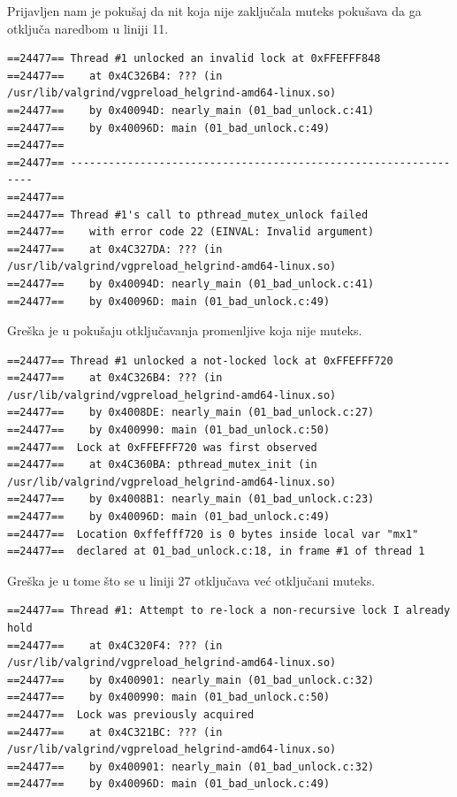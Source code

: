 Prijavljen nam je pokušaj da nit koja nije zaključala muteks pokušava da ga otključa naredbom u liniji 11.

\begin{verbatim}
==24477== Thread #1 unlocked an invalid lock at 0xFFEFFF848
==24477==    at 0x4C326B4: ??? (in /usr/lib/valgrind/vgpreload_helgrind-amd64-linux.so)
==24477==    by 0x40094D: nearly_main (01_bad_unlock.c:41)
==24477==    by 0x40096D: main (01_bad_unlock.c:49)
==24477==
==24477== ----------------------------------------------------------------
==24477==
==24477== Thread #1's call to pthread_mutex_unlock failed
==24477==    with error code 22 (EINVAL: Invalid argument)
==24477==    at 0x4C327DA: ??? (in /usr/lib/valgrind/vgpreload_helgrind-amd64-linux.so)
==24477==    by 0x40094D: nearly_main (01_bad_unlock.c:41)
==24477==    by 0x40096D: main (01_bad_unlock.c:49)
\end{verbatim}

Greška je u pokušaju otključavanja promenljive koja nije muteks.

\begin{verbatim}
==24477== Thread #1 unlocked a not-locked lock at 0xFFEFFF720
==24477==    at 0x4C326B4: ??? (in /usr/lib/valgrind/vgpreload_helgrind-amd64-linux.so)
==24477==    by 0x4008DE: nearly_main (01_bad_unlock.c:27)
==24477==    by 0x400990: main (01_bad_unlock.c:50)
==24477==  Lock at 0xFFEFFF720 was first observed
==24477==    at 0x4C360BA: pthread_mutex_init (in /usr/lib/valgrind/vgpreload_helgrind-amd64-linux.so)
==24477==    by 0x4008B1: nearly_main (01_bad_unlock.c:23)
==24477==    by 0x40096D: main (01_bad_unlock.c:49)
==24477==  Location 0xffefff720 is 0 bytes inside local var "mx1"
==24477==  declared at 01_bad_unlock.c:18, in frame #1 of thread 1
\end{verbatim}

Greška je u tome što se u liniji 27 otključava već otključani muteks.

\begin{verbatim}
==24477== Thread #1: Attempt to re-lock a non-recursive lock I already hold
==24477==    at 0x4C320F4: ??? (in /usr/lib/valgrind/vgpreload_helgrind-amd64-linux.so)
==24477==    by 0x400901: nearly_main (01_bad_unlock.c:32)
==24477==    by 0x400990: main (01_bad_unlock.c:50)
==24477==  Lock was previously acquired
==24477==    at 0x4C321BC: ??? (in /usr/lib/valgrind/vgpreload_helgrind-amd64-linux.so)
==24477==    by 0x400901: nearly_main (01_bad_unlock.c:32)
==24477==    by 0x40096D: main (01_bad_unlock.c:49)
\end{verbatim}

